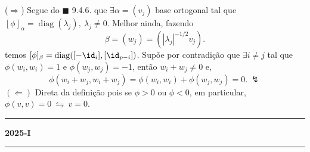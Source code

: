 \textcolor{gris}{
(\(\Rightarrow\)) Segue do \(\blacksquare\) 9.4.6. que \(\exists \alpha = (v_j)\) base ortogonal tal que \([\phi]_{\alpha} = \operatorname{diag}(\lambda_j), \ \lambda_j \neq 0\). Melhor ainda, fazendo 
\[\beta = (w_j) = (|\lambda_j|^{-1  /2}v_j). \]   
temos \([\phi]_{\beta} = \operatorname{diag}([-\id_i], [\id_{p-i}])\). Supõe por contradição que \(\exists i \neq j\) tal que \(\phi(w_i, w_i) =1\) e \(\phi(w_j, w_j) = -1\), então \(w_i + w_j \neq 0 \) e, 
\[
    \phi(w_i + w_j ,  w_i + w_j) = \phi(w_i, w_i) + \phi(w_j, w_j) = 0. \ \lightning 
\]
\((\Leftarrow)\) Direta da definição pois se \(\phi> 0\) ou \( \phi <0 \), em particular, \(\phi(v,v) = 0 \ \leftrightharpoons \ v = 0\).   
}

\newpage

\-\vspace{-0.3cm}
  {\hrule \vspace{-0.15cm}
  \centering \textbf{2025-I} \vspace{0.1cm}
  \hrule}

